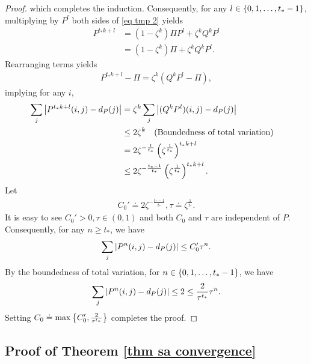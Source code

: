\documentclass[twoside,11pt]{article}
\numberwithin{assucounter}{section}
\begin{document}
\begin{proof}
  which completes the induction.
  Consequently,
  for any $l \in \qty{0, 1, \dots, t_* - 1}$,
  multiplying by $P^l$ both sides of \eqref{eq tmp 2} yields
  \begin{align}
      P^{t_*k + l} &= (1 - \zeta^k) \Pi P^l + \zeta^k Q^kP^l \\
      &=(1 - \zeta^k) \Pi + \zeta^k Q^kP^l.
  \end{align}
  Rearranging terms yields
  \begin{align}
      P^{t_*k + l} - \Pi = \zeta^k(Q^kP^l - \Pi),
  \end{align}
  implying for any $i$,
  \begin{align}
      \sum_{j} \abs{P^{t_*k+l}(i, j) - d_P(j)} &= \zeta^k \sum_j \abs{(Q^kP^l)(i, j) - d_P(j)} \\
      &\leq 2 \zeta^k 
      \qq{\hfill (Boundedness of total variation)} \\
      &= 2 \zeta^{-\frac{l}{t_*}} \left(\zeta^{\frac{1}{t_*}}\right)^{t_* k + l} \\
      &\leq 2 \zeta^{-\frac{t_*-1}{t_*}}\left(\zeta^{\frac{1}{t_*}}\right)^{t_* k + l}.
  \end{align}
  Let 
  \begin{align}
    C_0' \doteq 2 \zeta^{-\frac{t_*-1}{t_*}}, \tau \doteq \zeta^{\frac{1}{t_*}}.
  \end{align}
  It is easy to see $C_0' > 0, \tau \in (0, 1)$ and both $C_0$ and $\tau$ are independent of $P$.
  Consequently,
  for any $n \geq t_*$,
  we have
  \begin{align}
    \sum_j \abs{P^n(i, j) - d_P(j)} \leq C_0' \tau^n.
  \end{align}
  By the boundedness of total variation,
  for $n \in \qty{0, 1, \dots, t_* - 1}$,
  we have
  \begin{align}
    \sum_j \abs{P^n(i, j) - d_P(j)} \leq 2 \leq \frac{2}{\tau^{t_*}} \tau^n.
  \end{align}
  Setting $C_0 \doteq \max\qty{C_0', \frac{2}{\tau^{t_*}}}$ completes the proof.
\end{proof}

\subsection{Proof of Theorem \ref{thm sa convergence}}
\label{sec proof thm sa convergence}
\end{document}
